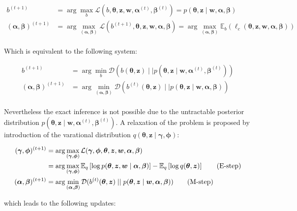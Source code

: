 \documentclass[12pt,a4paper,onecolumn]{article}
\begin{document}
\begin{align}
	b^{(t+1)}                         & = \operatorname{arg}\max_{b} \mathcal{L}(b, \bm{\theta},\bm{z}, \bm{w}, \bm{\alpha}^{(t)}, \bm{\beta}^{(t)}) = p(\bm{\theta}, \bm{z} \mid \bm{w}, \bm{\alpha}, \bm{\beta})                                    \tag{E-step}                                                     \\
	(\bm{\alpha}, \bm{\beta})^{(t+1)} & = \operatorname{arg}\max_{(\bm{\alpha}, \bm{\beta})} \mathcal{L}(b^{(t+1)}, \bm{\theta},\bm{z}, \bm{w}, \bm{\alpha}, \bm{\beta}) = \operatorname{arg}\max_{(\bm{\alpha}, \bm{\beta})} \mathbb{E}_{b}(\ell_c(\bm{\theta},\bm{z}, \bm{w}, \bm{\alpha}, \bm{\beta})) \tag{M-step} \\
\end{align}

Which is equivalent to the following system:

\begin{align}
	b^{(t+1)}                         & = \operatorname{arg}\min_{b} \mathcal{D}(b(\bm{\theta}, \bm{z})\mid\mid p(\bm{\theta},\bm{z}\mid \bm{w}, \bm{\alpha}^{(t)}, \bm{\beta}^{(t)}))          \tag{E-step}                   \\
	(\bm{\alpha}, \bm{\beta})^{(t+1)} & = \operatorname{arg}\min_{(\bm{\alpha}, \bm{\beta})} \mathcal{D}(b^{(t)}(\bm{\theta}, \bm{z})\mid\mid p(\bm{\theta},\bm{z}\mid \bm{w}, \bm{\alpha}, \bm{\beta}))          \tag{M-step} \\
\end{align}

Nevertheless the exact inference is not possible due to the untractable posterior distribution \(p(\bm{\theta},\bm{z}\mid \bm{w}, \bm{\alpha}^{(t)}, \bm{\beta}^{(t)})\). A relaxation of the problem is proposed by introduction of the varational distribution \(q(\bm{\theta}, \bm{z} \mid \bm{\gamma}, \bm{\phi})\):

\begin{align}
	(\bm{\gamma}, \bm{\phi})^{(t+1)}
	                                  & = \operatorname{arg}\max_{(\bm{\gamma}, \bm{\phi})} \mathcal{L}(\bm{\gamma}, \bm{\phi}, \bm{\theta},\bm{z}, \bm{w}, \bm{\alpha}, \bm{\beta})                                                                                \notag     \\
	                                  & = \operatorname{arg}\max_{(\bm{\gamma}, \bm{\phi})} \mathbb{E}_{q}\left[\log p(\bm{\theta},\bm{z}, \bm{w} \mid \bm{\alpha}, \bm{\beta})\right] - \mathbb{E}_{q}\left[\log q(\bm{\theta}, \bm{z})\right]                   \tag{E-step} \\
	(\bm{\alpha}, \bm{\beta})^{(t+1)} & = \operatorname{arg}\min_{(\bm{\alpha}, \bm{\beta})} \mathcal{D}(b^{(t)}(\bm{\theta}, \bm{z})\mid\mid p(\bm{\theta},\bm{z}\mid \bm{w}, \bm{\alpha}, \bm{\beta}))          \tag{M-step}                                                 \\
\end{align}

which leads to the following updates:
\end{document}
